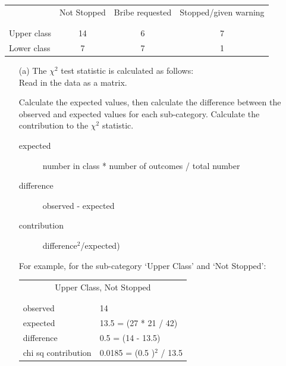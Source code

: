 \documentclass[12pt,letterpaper]{article}
\begin{document}
\newpage
\begin{table}[h!]
	\centering
	\begin{tabular}{l | c c c }
		& Not Stopped & Bribe requested & Stopped/given warning \\
		\\[-1.8ex] 
		\hline \\[-1.8ex]
		Upper class & 14 & 6 & 7 \\
		Lower class & 7 & 7 & 1 \\
		\hline
	\end{tabular}
\end{table}

\begin{enumerate}

	\item [(a)]
	The $\chi^2$ test statistic is calculated as follows:\\
	
	Read in the data as a matrix.
	  

	Calculate the expected values, then calculate the difference between the observed 
	and expected values for each sub-category.  Calculate the contribution to the 
	$\chi^2$ statistic. 
	\begin{description}
	  \item[expected] number in class * number of outcomes / total number
	  \item[difference] observed - expected
	  \item[contribution] difference$^2$/expected) 
	 \end{description}
		
		For example, for the sub-category `Upper Class' and `Not Stopped':
	
	\begin{table}[htb]
		\centering
		\begin{tabular}{l | l}
			\multicolumn{2}{c}{Upper Class, Not Stopped} \\
			\\[-1.8ex] 
			\hline \\[-1.8ex]
			observed  &  14  \\
			expected  &  13.5 = (27 * 21 / 42)\\
			difference  &  0.5  = (14 - 13.5)\\
			chi sq contribution  &  0.0185  = (0.5 )$^2$ / 13.5\\
			
		\end{tabular}
	\end{table}
	

\end{enumerate}
\end{document}
